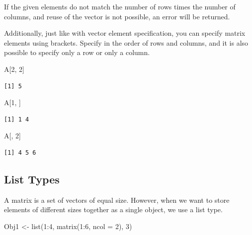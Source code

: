 \documentclass[
  a4paper,
]{book}
\newenvironment{Shaded}{\begin{snugshade}}{\end{snugshade}}
\newcommand{\AttributeTok}[1]{\textcolor[rgb]{0.40,0.45,0.13}{#1}}
\newcommand{\DecValTok}[1]{\textcolor[rgb]{0.68,0.00,0.00}{#1}}
\newcommand{\FunctionTok}[1]{\textcolor[rgb]{0.28,0.35,0.67}{#1}}
\newcommand{\NormalTok}[1]{\textcolor[rgb]{0.00,0.23,0.31}{#1}}
\newcommand{\OtherTok}[1]{\textcolor[rgb]{0.00,0.23,0.31}{#1}}
\newcommand{\SpecialCharTok}[1]{\textcolor[rgb]{0.37,0.37,0.37}{#1}}
\begin{document}
If the given elements do not match the number of rows times the number
of columns, and reuse of the vector is not possible, an error will be
returned.

Additionally, just like with vector element specification, you can
specify matrix elements using brackets. Specify in the order of rows and
columns, and it is also possible to specify only a row or only a column.

\begin{Shaded}
\begin{Highlighting}[]
\NormalTok{A[}\DecValTok{2}\NormalTok{, }\DecValTok{2}\NormalTok{]}
\end{Highlighting}
\end{Shaded}

\begin{verbatim}
[1] 5
\end{verbatim}

\begin{Shaded}
\begin{Highlighting}[]
\NormalTok{A[}\DecValTok{1}\NormalTok{, ]}
\end{Highlighting}
\end{Shaded}

\begin{verbatim}
[1] 1 4
\end{verbatim}

\begin{Shaded}
\begin{Highlighting}[]
\NormalTok{A[, }\DecValTok{2}\NormalTok{]}
\end{Highlighting}
\end{Shaded}

\begin{verbatim}
[1] 4 5 6
\end{verbatim}

\subsection{List Types}\label{list-types}

A matrix is a set of vectors of equal size. However, when we want to
store elements of different sizes together as a single object, we use a
list type.

\begin{Shaded}
\begin{Highlighting}[]
\NormalTok{Obj1 }\OtherTok{\textless{}{-}} \FunctionTok{list}\NormalTok{(}\DecValTok{1}\SpecialCharTok{:}\DecValTok{4}\NormalTok{, }\FunctionTok{matrix}\NormalTok{(}\DecValTok{1}\SpecialCharTok{:}\DecValTok{6}\NormalTok{, }\AttributeTok{ncol =} \DecValTok{2}\NormalTok{), }\DecValTok{3}\NormalTok{)}
\end{Highlighting}
\end{Shaded}
\end{document}
